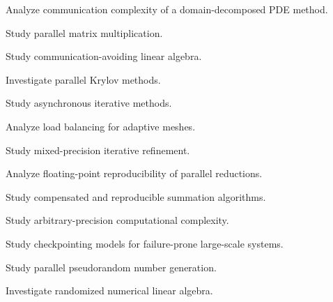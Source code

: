 \begin{exercise}[4]
Analyze communication complexity of a domain-decomposed PDE method.
\end{exercise}

\begin{exercise}[4]
Study parallel matrix multiplication.
\end{exercise}

\begin{exercise}[4]
Study communication-avoiding linear algebra.
\end{exercise}

\begin{exercise}[4]
Investigate parallel Krylov methods.
\end{exercise}

\begin{exercise}[4]
Study asynchronous iterative methods.
\end{exercise}

\begin{exercise}[4]
Analyze load balancing for adaptive meshes.
\end{exercise}

\begin{exercise}[4]
Study mixed-precision iterative refinement.
\end{exercise}

\begin{exercise}[4]
Analyze floating-point reproducibility of parallel reductions.
\end{exercise}

\begin{exercise}[4]
Study compensated and reproducible summation algorithms.
\end{exercise}

\begin{exercise}[4]
Study arbitrary-precision computational complexity.
\end{exercise}

\begin{exercise}[4]
Study checkpointing models for failure-prone large-scale systems.
\end{exercise}

\begin{exercise}[4]
Study parallel pseudorandom number generation.
\end{exercise}

\begin{exercise}[4]
Investigate randomized numerical linear algebra.
\end{exercise}


